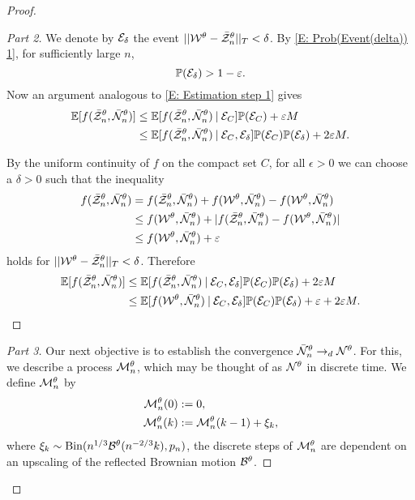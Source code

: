 \begin{proof}
\begin{proof}[Part 2]
We denote by $\Event{\delta}$ the event $\norm{\WtX - \rzntX}_T < \delta$.
By \eqref{E: Prob(Event(delta)) 1}, for sufficiently large $n$, 
\begin{equation*} \label{E: Prob Event delta}
\Prob(\Event{\delta}) > 1 - \epsilon.
\end{equation*}
Now an argument analogous to \eqref{E: Estimation step 1} gives
\begin{equation*} \label{E: Estimation step 2}
\begin{aligned}
\ExpSm{f(\rzntX, \rnntX) } 
&\leq \ExpSm{f(\rzntX, \rnntX) \cond \Event{C}}\Prob(\Event{C}) + \epsilon M \\
&\leq \ExpSm{f(\rzntX, \rnntX) \cond \Event{C}, \Event{\delta}}\Prob(\Event{C})\Prob(\Event{\delta}) + 2 \epsilon M.
\end{aligned}
\end{equation*}

By the uniform continuity of $f$ on the compact set $C$, 
for all $\epsilon>0$ we can choose a $\delta > 0$ such that the inequality
\begin{equation*}
\begin{aligned}
f(\rzntX, \rnntX) &= f(\rzntX, \rnntX) + f(\WtX, \rnntX) - f(\WtX, \rnntX) \\
&\leq f(\WtX, \rnntX) + |f(\rzntX, \rnntX) - f(\WtX, \rnntX)| \\
&\leq f(\WtX, \rnntX) + \epsilon
\end{aligned}
\end{equation*}
holds for $\norm{\WtX - \rzntX}_T < \delta$. Therefore
\begin{equation} \label{E: Estimation step 3}
\begin{aligned}
\ExpSm{f(\rzntX, \rnntX) } 
&\leq \ExpSm{f(\rzntX, \rnntX) \cond \Event{C}, \Event{\delta}}\Prob(\Event{C})\Prob(\Event{\delta}) + 2 \epsilon M \\
&\leq \ExpSm{f(\WtX, \rnntX) \cond \Event{C}, \Event{\delta}}\Prob(\Event{C})\Prob(\Event{\delta}) + \epsilon + 2 \epsilon M.
\end{aligned}
\end{equation}
\end{proof}




\begin{proof}[Part 3]\renewcommand{\qedsymbol}{}
Our next objective is to establish the convergence $\rnntX \rightarrow_d \NtX$.
For this, we describe a process $\Ndis$, which may be thought of as $\NtX$ in discrete time.
We define $\Ndis$ by
\begin{equation} \label{D: Ndis}
\begin{aligned}
\Ndis(0) &:= 0, \\
\Ndis(k) &:= \Ndis(k-1) + \xi_k, 
\end{aligned}
\end{equation}
where $\xi_k \sim \Binom(\n{1}{3}\BtX(\n{-2}{3}k), \p)$,
the discrete steps of $\Ndis$ are dependent on an upscaling of the reflected Brownian motion $\BtX$.


\end{proof}
\end{proof}
